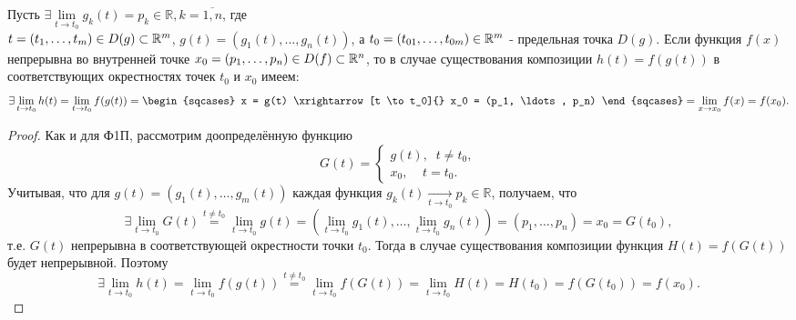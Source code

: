 \begin{consequence}
	Пусть $\exists \lim\limits_{t \to t_0}g_k(t) = p_k \in \mathbb{R}, k = \overline{1, n}$, где \\
	${t = (t_1, \ldots, t_m) \in D(g) \subset \mathbb{R}^{m}}$, ${g(t) = (g_1(t), \ldots, g_n(t))}$, а
	${t_0 = (t_{01}, \ldots, t_{0m}) \in \mathbb{R}^{m}}$ - предельная точка $D(g)$. Если функция $f(x)$
	непрерывна во внутренней точке $x_0 = (p_1, \ldots, p_n) \in D(f) \subset \mathbb{R}^{n}$, то в случае
	существования композиции $h(t) = f(g(t))$ в соответствующих окрестностях точек $t_0$ и $x_0$
	имеем:
	\begin{equation*}
		\exists \lim\limits_{t \to t_0}h(t) = \lim\limits_{t \to t_0}f(g(t)) =
		\begin{sqcases}
			x = g(t) \xrightarrow[t \to t_0]{} x_0 = (p_1, \ldots, p_n)
		\end{sqcases}
		= \lim\limits_{x \to x_0}f(x) = f(x_0).
	\end{equation*}
    
    \begin{proof}
        Как и для Ф1П, рассмотрим доопределённую функцию
        \begin{equation*}
        G(t) = \begin{cases}
        g(t), \;\; t \neq t_0,\\
        x_0, \;\;\;\; t = t_0.
        \end{cases}
        \end{equation*}
        Учитывая, что для $g(t) = (g_1(t), \ldots, g_m(t))$ каждая функция $g_k(t) \xrightarrow[t \to t_0]{} p_k \in \mathbb{R}$, получаем, что
        \begin{equation*}
        \exists \lim\limits_{t \to t_0}G(t) \overset{t \neq t_0}{=} \lim\limits_{t \to t_0} g(t) = (\lim\limits_{t \to t_0} g_1(t), \ldots, \lim\limits_{t \to t_0} g_n(t))
        = (p_1, \ldots , p_n) = x_0 = G(t_0),
        \end{equation*}
        т.е. $G(t)$ непрерывна в соответствующей окрестности точки $t_0$. Тогда в случае существования
        композиции функция $H(t) = f(G(t))$ будет непрерывной. Поэтому
        \begin{equation*}
        \exists \lim\limits_{t \to t_0}h(t) = \lim\limits_{t \to t_0}f(g(t)) \overset{t \neq t_0}{=}
        \lim\limits_{t \to t_0}f(G(t)) = \lim\limits_{t \to t_0}H(t) = H(t_0) = f(G(t_0)) = f(x_0).
        \end{equation*}
    \end{proof}
    	
\end{consequence}

